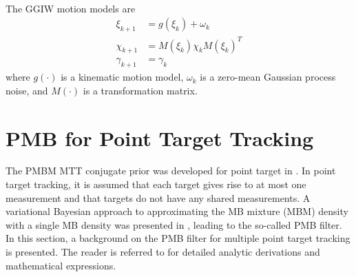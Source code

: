 ~\\
The GGIW motion models are
\begin{subequations}
\begin{align}
\xi_{k+1} &= g(\xi_k) + \omega_k\\
\chi_{k+1} &= M(\xi_k)\chi_kM(\xi_k)^T\\
\gamma_{k+1} &= \gamma_{k}
\end{align}
\end{subequations}
where $g(\cdot)$ is a kinematic motion model, $\omega_k$ is a zero-mean Gaussian process noise, and $M(\cdot)$ is a transformation matrix. 




\section{PMB for Point Target Tracking}
The PMBM MTT conjugate prior was developed for point target in \cite{pmbmpoint,pmbmpoint2}. In point target tracking, it is assumed that each target gives rise to at most one measurement and that targets do not have any shared measurements. A variational Bayesian approach to approximating the MB mixture (MBM) density with a single MB density was presented in \cite{variational}, leading to the so-called PMB filter. In this section, a background on the PMB filter for multiple point target tracking is presented. The reader is referred to \cite{variational,pmbmpoint} for detailed analytic derivations and mathematical expressions.

